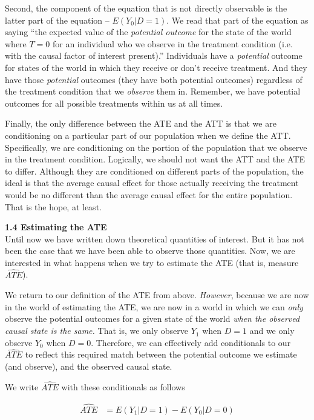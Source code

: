 \documentclass[11pt]{article}
\begin{document}
Second, the component of the equation that is not directly observable is the latter part of the equation -- $E(Y_{0}|D=1)$.  We read that part of the equation as saying ``the expected value of the \emph{potential outcome} for the state of the world where $T=0$ for an individual who we observe in the treatment condition (i.e. with the causal factor of interest present).''  Individuals have a \emph{potential} outcome for states of the world in which they receive or don't receive treatment.  And they have those \emph{potential} outcomes (they have both potential outcomes) regardless of the treatment condition that we \emph{observe} them in.  Remember, we have potential outcomes for all possible treatments within us at all times.

Finally, the only difference between the ATE and the ATT is that we are conditioning on a particular part of our population when we define the ATT.  Specifically, we are conditioning on the portion of the population that we observe in the treatment condition.  Logically, we should not want the ATT and the ATE to differ.  Although they are conditioned on different parts of the population, the ideal is that the average causal effect for those actually receiving the treatment would be no different than the average causal effect for the entire population.  That is the hope, at least.


\vspace{.2in}
\large{\textbf{1.4 Estimating the ATE}} \\

\normalsize
Until now we have written down theoretical quantities of interest.  But it has not been the case that we have been able to observe those quantities.  Now, we are interested in what happens when we try to estimate the ATE (that is, measure $\widehat{ATE}$).

We return to our definition of the ATE from above.  \emph{However}, because we are now in the world of estimating the ATE, we are now in a world in which we can \emph{only} observe the potential outcomes for a given state of the world \emph{when the observed causal state is the same.}  That is, we only observe $Y_{1}$ when $D=1$ and we only observe $Y_{0}$ when $D=0$.  Therefore, we can effectively add conditionals to our $\widehat{ATE}$ to reflect this required match between the potential outcome we estimate (and observe), and the observed causal state.

We write $\widehat{ATE}$ with these conditionals as follows

\begin{align*}
  \widehat{ATE} &= E(Y_{1}|D=1) - E(Y_{0}|D=0) \\
\end{align*}
\end{document}
